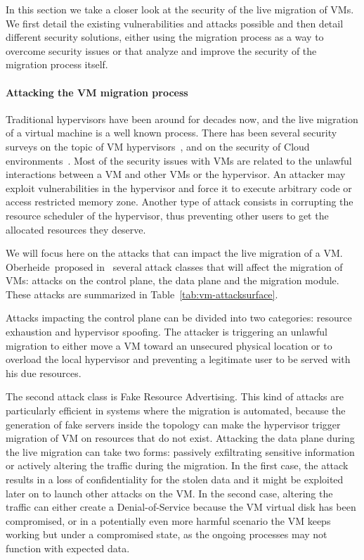 In this section we take a closer look at the security of the live migration of VMs.
We first detail the existing vulnerabilities and attacks possible and then detail different security solutions, either using the migration process as a way to overcome security issues or that analyze and improve the security of the migration process itself.

\paragraph{Attacking the VM migration process}
Traditional hypervisors have been around for decades now, and the live migration of a virtual machine is a well known process. There has been several security surveys on the topic of VM hypervisors~\cite{Reuben2007,Rehman2013,Sahoo2010,Perez-Botero2013}, and on the security of Cloud environments~\cite{cloudenvironmentsecuritysurvey-fernandes2014}.
Most of the security issues with VMs are related to the unlawful interactions between a VM and other VMs or the hypervisor.
An attacker may exploit vulnerabilities in the hypervisor and force it to execute arbitrary code or access restricted memory zone.
Another type of attack consists in corrupting the resource scheduler of the hypervisor, thus preventing other users to get the allocated resources they deserve.

We will focus here on the attacks that can impact the live migration of a VM.
Oberheide~\etal proposed in~\cite{empirical-oberheide2008} several attack classes that will affect the migration of VMs: attacks on the control plane, the data plane and the migration module.
These attacks are summarized in Table~\ref{tab:vm-attacksurface}.

Attacks impacting the control plane can be divided into two categories: resource exhaustion and hypervisor spoofing. The attacker is triggering an unlawful migration to either move a VM toward an unsecured physical location or to overload the local hypervisor and preventing a legitimate user to be served with his due resources.

The second attack class is Fake Resource Advertising. This kind of attacks are particularly efficient in systems where the migration is automated, because the generation of fake servers inside the topology can make the hypervisor trigger migration of VM on resources that do not exist.
Attacking the data plane during the live migration can take two forms: passively exfiltrating sensitive information or actively altering the traffic during the migration.
In the first case, the attack results in a loss of confidentiality for the stolen data and it might be exploited later on to launch other attacks on the VM.
In the second case, altering the traffic can either create a Denial-of-Service because the VM virtual disk has been compromised, or in a potentially even more harmful scenario the VM keeps working but under a compromised state, as the ongoing processes may not function with expected data.

